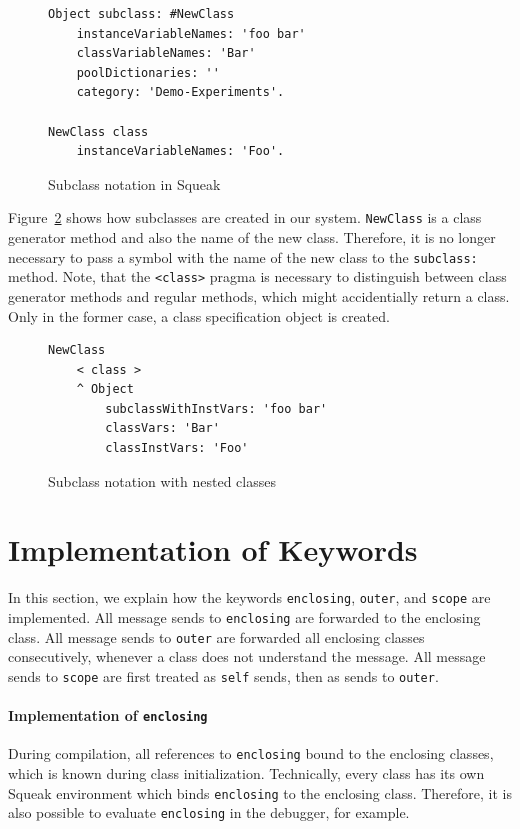 \begin{figure}[!htp]
\begin{lstlisting}
Object subclass: #NewClass
    instanceVariableNames: 'foo bar'
    classVariableNames: 'Bar'
    poolDictionaries: ''
    category: 'Demo-Experiments'.

NewClass class
	instanceVariableNames: 'Foo'.
\end{lstlisting}
\caption{Subclass notation in Squeak}
\label{fig:impl_subclass_squeak}
\end{figure}

Figure~\ref{fig:impl_subclass_nested} shows how subclasses are created in our system. \texttt{NewClass} is a class generator method and also the name of the new class. Therefore, it is no longer necessary to pass a symbol with the name of the new class to the \texttt{subclass:} method. Note, that the \texttt{<class>} pragma is necessary to distinguish between class generator methods and regular methods, which might accidentially return a class. Only in the former case, a class specification object is created.

\begin{figure}[!htp]
\begin{lstlisting}
NewClass
    < class >
    ^ Object 
        subclassWithInstVars: 'foo bar'
        classVars: 'Bar'
        classInstVars: 'Foo'
\end{lstlisting}
\caption{Subclass notation with nested classes}
\label{fig:impl_subclass_nested}
\end{figure}

\section{Implementation of Keywords}
In this section, we explain how the keywords \texttt{enclosing}, \texttt{outer}, and \texttt{scope} are implemented. All message sends to \texttt{enclosing} are forwarded to the enclosing class. All message sends to \texttt{outer} are forwarded all enclosing classes consecutively, whenever a class does not understand the message. All message sends to \texttt{scope} are first treated as \texttt{self} sends, then as sends to \texttt{outer}.

\paragraph{Implementation of \texttt{enclosing}}
During compilation, all references to \texttt{enclosing} bound to the enclosing classes, which is known during class initialization. Technically, every class has its own Squeak environment which binds \texttt{enclosing} to the enclosing class. Therefore, it is also possible to evaluate \texttt{enclosing} in the debugger, for example.

